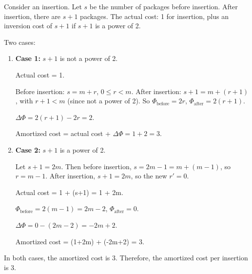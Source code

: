 Consider an insertion. Let \(s\) be the number of packages before insertion. After insertion, there are \(s+1\) packages. The actual cost: 1 for insertion, plus an inversion cost of \(s+1\) if \(s+1\) is a power of 2.

Two cases:
\begin{enumerate}
    \item \textbf{Case 1:} \(s+1\) is not a power of 2.
    
    Actual cost = 1.
    
    Before insertion: \(s = m + r\), \(0 \leq r < m\). After insertion: \(s+1 = m + (r+1)\), with \(r+1 < m\) (since not a power of 2). So \(\Phi_{\text{before}} = 2r\), \(\Phi_{\text{after}} = 2(r+1)\).
    
    \(\Delta\Phi = 2(r+1) - 2r = 2\).
    
    Amortized cost = actual cost + \(\Delta\Phi = 1 + 2 = 3\).

    \item \textbf{Case 2:} \(s+1\) is a power of 2.
    
    Let \(s+1 = 2m\). Then before insertion, \(s = 2m-1 = m + (m-1)\), so \(r = m-1\). After insertion, \(s+1 = 2m\), so the new \(r' = 0\).
    
    Actual cost = 1 + (s+1) = 1 + 2m.
    
    \(\Phi_{\text{before}} = 2(m-1) = 2m-2\), \(\Phi_{\text{after}} = 0\).
    
    \(\Delta\Phi = 0 - (2m-2) = -2m+2\).
    
    Amortized cost = (1+2m) + (-2m+2) = 3.
\end{enumerate}

In both cases, the amortized cost is 3. Therefore, the amortized cost per insertion is 3.


\newpage